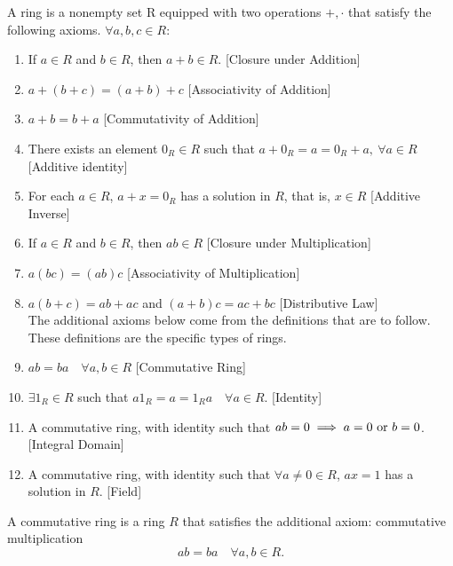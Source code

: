 \documentclass[../main.tex]{subfiles}
\begin{document}
\begin{definition}[Ring]\label{def:ring}
A ring is a nonempty set R equipped with two operations \(+, \cdot\) that satisfy the following axioms. \(\forall a,b,c \in R\):
\begin{enumerate}
    \item If \(a \in R\) and \(b \in R\), then \(a + b \in R\). \hfill [Closure under Addition]
    \item \(a + (b+c) = (a+b)+c\) \hfill [Associativity of Addition]
    \item \(a + b = b + a\) \hfill [Commutativity of Addition]
    \item There exists an element \( 0_R \in R\) such that \(a + 0_R = a = 0_R + a, \ \forall a \in R\) \hfill [Additive identity]
    \item For each \(a \in R\), \(a + x = 0_R\) has a solution in \(R\), that is, \(x \in R\) \hfill [Additive Inverse]
    \item If \(a \in R\) and \(b \in R\), then \(ab \in R\) \hfill [Closure under Multiplication]
    \item \(a(bc) = (ab)c\) \hfill [Associativity of Multiplication]
    \item \( a(b+c) = ab + ac\) and \((a+b)c = ac + bc\) \hfill [Distributive Law] \\
The additional axioms below come from the definitions that are to follow. These definitions are the specific types of rings.
    \item $ab = ba \quad \forall a,b \in R$ \hfill [Commutative Ring] 
    \item $\exists 1_R \in R$ such that $a1_R = a = 1_Ra \quad \forall a \in R $. \hfill [Identity] 
    \item A commutative ring, with identity such that $ab=0 \implies a= 0 \textnormal{ or } b=0$. \hfill [Integral Domain] 
    \item A commutative ring, with identity such that $\forall a \neq 0 \in R$, $ax = 1$ has a solution in $R$. \hfill [Field] 
\end{enumerate}

\end{definition}


\begin{definition}\label{def:commutative_ring}
A commutative ring is a ring \(R\) that satisfies the additional axiom: commutative multiplication
\[
ab = ba \quad \forall a,b \in R.
\]
\end{definition}
\end{document}
